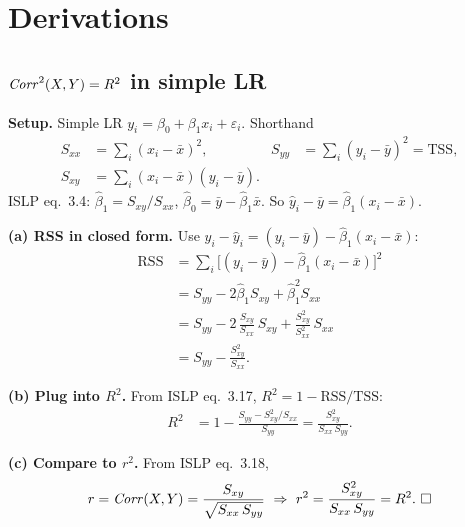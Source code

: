 \section{Derivations}

\subsection{$\mathop{\mathit{Corr}}^2(X,Y)=R^2$ in simple LR}

\textbf{Setup.} Simple LR $y_i=\beta_0+\beta_1 x_i+\varepsilon_i$. Shorthand
\begin{align*}
S_{xx} &= \textstyle\sum_i (x_i-\bar x)^2, &
S_{yy} &= \textstyle\sum_i (y_i-\bar y)^2 = \mathrm{TSS},\\
S_{xy} &= \textstyle\sum_i (x_i-\bar x)(y_i-\bar y).
\end{align*}
ISLP eq.\ 3.4: $\hat\beta_1=S_{xy}/S_{xx}$, $\hat\beta_0=\bar y-\hat\beta_1\bar x$. So $\hat y_i-\bar y = \hat\beta_1(x_i-\bar x)$.

\textbf{(a) RSS in closed form.} Use $y_i-\hat y_i = (y_i-\bar y)-\hat\beta_1(x_i-\bar x)$:
\begin{align*}
\mathrm{RSS}
&= \textstyle\sum_i\big[(y_i-\bar y)-\hat\beta_1(x_i-\bar x)\big]^2\\
&= S_{yy} - 2\hat\beta_1 S_{xy} + \hat\beta_1^2 S_{xx}\\
&= S_{yy} - 2\,\tfrac{S_{xy}}{S_{xx}}\,S_{xy} + \tfrac{S_{xy}^2}{S_{xx}^2}\,S_{xx}\\
&= S_{yy} - \tfrac{S_{xy}^2}{S_{xx}}.
\end{align*}

\textbf{(b) Plug into $R^2$.} From ISLP eq.\ 3.17, $R^2=1-\mathrm{RSS}/\mathrm{TSS}$:
\begin{align*}
R^2
&= 1 - \frac{S_{yy} - S_{xy}^2/S_{xx}}{S_{yy}}
 = \frac{S_{xy}^2}{S_{xx}\,S_{yy}}.
\end{align*}

\textbf{(c) Compare to $r^2$.} From ISLP eq.\ 3.18,
\begin{align*}
r=\Corr(X,Y)=\frac{S_{xy}}{\sqrt{S_{xx}\,S_{yy}}}\ \Rightarrow\ r^2=\frac{S_{xy}^2}{S_{xx}\,S_{yy}}=R^2.\ \square
\end{align*}

